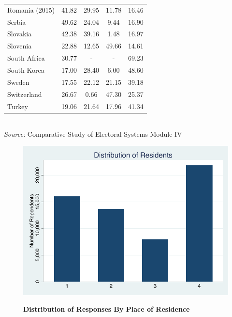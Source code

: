 \documentclass[12pt, titlepage]{article}
\newcommand\e{\emph}
\newcommand\tb{\textbf}
\begin{document}
\begin{table}
\begin{tabulary}{\linewidth}{l c c c c}
		Romania (2015)&41.82&29.95&11.78&16.46 \\
		Serbia&49.62&24.04&9.44&16.90 \\
		Slovakia&42.38&39.16&1.48&16.97 \\
		Slovenia&22.88&12.65&49.66&14.61 \\
		South Africa&30.77&-&-&69.23 \\
		South Korea&17.00&28.40&6.00&48.60 \\
		Sweden&17.55&22.12&21.15&39.18 \\
		Switzerland&26.67&0.66&47.30&25.37 \\
		Turkey&19.06&21.64&17.96&41.34 \\
		\hline
	\end{tabulary} \\
\e{Source:} Comparative Study of Electoral Systems Module IV 
\label{table2}
\end{table}


\begin{figure}[ht!]    \centering
	{	 \includegraphics[width=\textwidth]{Residents}}
	\caption{\tb{Distribution of Responses By Place of Residence}}\label{figure1}
\end{figure}
\end{document}
